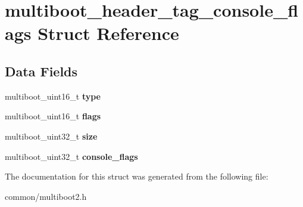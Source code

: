 \hypertarget{structmultiboot__header__tag__console__flags}{}\section{multiboot\+\_\+header\+\_\+tag\+\_\+console\+\_\+flags Struct Reference}
\label{structmultiboot__header__tag__console__flags}
\subsection*{Data Fields}
\begin{DoxyCompactItemize}
\item 
multiboot\+\_\+uint16\+\_\+t {\bfseries type}\hypertarget{structmultiboot__header__tag__console__flags_a001f3bf1c38e837fe3e1e0653aac2848}{}\label{structmultiboot__header__tag__console__flags_a001f3bf1c38e837fe3e1e0653aac2848}

\item 
multiboot\+\_\+uint16\+\_\+t {\bfseries flags}\hypertarget{structmultiboot__header__tag__console__flags_aa953cfe34184d7f3aac9f077b41a379a}{}\label{structmultiboot__header__tag__console__flags_aa953cfe34184d7f3aac9f077b41a379a}

\item 
multiboot\+\_\+uint32\+\_\+t {\bfseries size}\hypertarget{structmultiboot__header__tag__console__flags_adeb3729b31ae312fd6848ec7d4d803cd}{}\label{structmultiboot__header__tag__console__flags_adeb3729b31ae312fd6848ec7d4d803cd}

\item 
multiboot\+\_\+uint32\+\_\+t {\bfseries console\+\_\+flags}\hypertarget{structmultiboot__header__tag__console__flags_a62da2cb6b784bde170b7928d79a44d18}{}\label{structmultiboot__header__tag__console__flags_a62da2cb6b784bde170b7928d79a44d18}

\end{DoxyCompactItemize}


The documentation for this struct was generated from the following file\+:\begin{DoxyCompactItemize}
\item 
common/multiboot2.\+h\end{DoxyCompactItemize}
